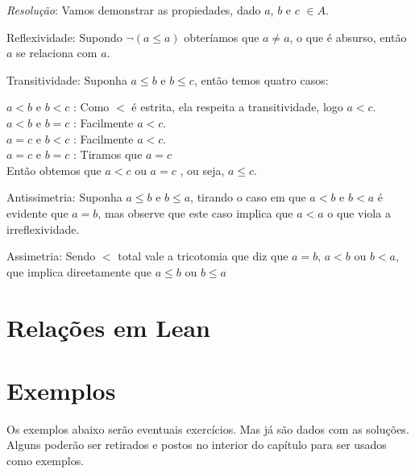 \begin{enumerate}
    \textit{Resolução}: Vamos demonstrar as propiedades, dado $a$, $b$ e $c$ $\in A$.
    
    Reflexividade: Supondo $\neg(a \leq a)$ obteríamos que $a \neq a$, o que é absurso, então $a$ se relaciona com $a$.
    
    Transitividade: Suponha $a \leq b$ e $b \leq c$, então temos quatro casos:
    
    $a<b$ e $b<c$ : Como $<$ é estrita, ela respeita a transitividade, logo $a<c$.\\
    $a<b$ e $b=c$ : Facilmente $a<c$.\\
    $a=c$ e $b<c$ : Facilmente $a<c$.\\
    $a=c$ e $b=c$ : Tiramos que $a=c$\\
    Então obtemos que $a<c$ ou $a=c$ , ou seja, $a \leq c$.
    
    Antissimetria: Suponha $a \leq b$ e $b \leq a$, tirando o caso em que $a<b$ e $b<a$ é evidente que $a=b$, mas observe que este caso implica que $a<a$ o que viola a irreflexividade.
    
    Assimetria: Sendo $<$ total vale a tricotomia que diz que $a=b$, $a<b$ ou $b<a$, que implica direetamente que $a \leq b$ ou  $b \leq a$
    
    
\end{enumerate}

\section{Relações em Lean}

\section{Exemplos}
Os exemplos abaixo serão eventuais exercícios.
Mas já são dados com as soluções. Alguns poderão ser retirados e postos no interior do capítulo para ser usados como exemplos.

